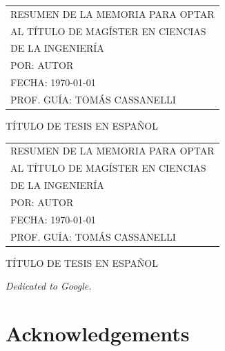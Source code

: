 \documentclass[
	12pt,
	letterpaper,
  oneside
  ]{book}
\makeatletter
\newenvironment{preliminary}%
  {\pagestyle{plain}\pagenumbering{roman}}%
  {\cleardoublepage\pagenumbering{arabic}}
\newenvironment{dedication}%
  {
  \if@openright\cleardoublepage\else\clearpage\fi
  \vspace*{\stretch{1}}
  \itshape
  \raggedleft
  \begingroup}%
  {\par\vspace{\stretch{3}}\endgroup\newpage}
\newenvironment{acknowledgements}%
  {\if@openright\cleardoublepage\else\clearpage\fi

  \chapter*{Acknowledgements}

   \begingroup}%
  {\par\endgroup\newpage}
\makeatother
\begin{document}
  \newpage
  
  \begin{preliminary}
  
  
  \setcounter{page}{2}

  \begin{tabular}{l}
		RESUMEN DE LA MEMORIA PARA OPTAR \\
		AL TÍTULO DE MAGÍSTER EN CIENCIAS \\
		DE LA INGENIERÍA \\
		POR: \MakeUppercase{Autor} \\
		FECHA: \MakeUppercase{\today} \\
		PROF. GUÍA: TOMÁS CASSANELLI
	\end{tabular}

  \begin{center}
    \MakeUppercase{Título de tesis en español}
  \end{center}
  \lipsum[1-2]

  \newpage

  \begin{tabular}{l}
		RESUMEN DE LA MEMORIA PARA OPTAR \\
		AL TÍTULO DE MAGÍSTER EN CIENCIAS \\
		DE LA INGENIERÍA \\
		POR: \MakeUppercase{Autor} \\
		FECHA: \MakeUppercase{\today} \\
		PROF. GUÍA: TOMÁS CASSANELLI
	\end{tabular}

  \begin{center}
    \MakeUppercase{Título de tesis en español}
  \end{center}
  \lipsum[1-2]

  \newpage

  \begin{dedication}
    Dedicated to Google.
  \end{dedication}

  \newpage

  \begin{acknowledgements}
    \lipsum[1-2]
  \end{acknowledgements}

  \tableofcontents

  \listoftables

  \listoffigures

\end{preliminary}




\end{document}
